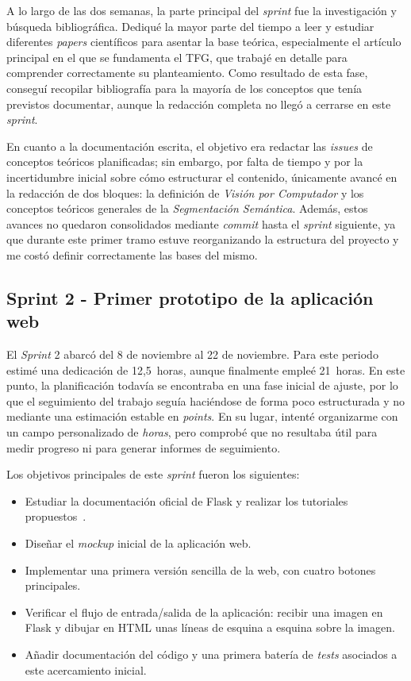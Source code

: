 A lo largo de las dos semanas, la parte principal del \textit{sprint} fue la investigación y búsqueda bibliográfica. Dediqué la mayor parte del tiempo a leer y estudiar diferentes \textit{papers} científicos para asentar la base teórica, especialmente el artículo principal en el que se fundamenta el TFG, que trabajé en detalle para comprender correctamente su planteamiento. Como resultado de esta fase, conseguí recopilar bibliografía para la mayoría de los conceptos que tenía previstos documentar, aunque la redacción completa no llegó a cerrarse en este \textit{sprint}.

En cuanto a la documentación escrita, el objetivo era redactar las \textit{issues} de conceptos teóricos planificadas; sin embargo, por falta de tiempo y por la incertidumbre inicial sobre cómo estructurar el contenido, únicamente avancé en la redacción de dos bloques: la definición de \textit{Visión por Computador} y los conceptos teóricos generales de la \textit{Segmentación Semántica}. Además, estos avances no quedaron consolidados mediante \textit{commit} hasta el \textit{sprint} siguiente, ya que durante este primer tramo estuve reorganizando la estructura del proyecto y me costó definir correctamente las bases del mismo.

\subsection{Sprint 2 - Primer prototipo de la aplicación web}
El \textit{Sprint} 2 abarcó del 8 de noviembre al 22 de noviembre. Para este periodo estimé una dedicación de 12,5~horas, aunque finalmente empleé 21~horas. En este punto, la planificación todavía se encontraba en una fase inicial de ajuste, por lo que el seguimiento del trabajo seguía haciéndose de forma poco estructurada y no mediante una estimación estable en \textit{points}. En su lugar, intenté organizarme con un campo personalizado de \textit{horas}, pero comprobé que no resultaba útil para medir progreso ni para generar informes de seguimiento.

Los objetivos principales de este \textit{sprint} fueron los siguientes:
\begin{itemize}
	\item Estudiar la documentación oficial de Flask y realizar los tutoriales propuestos~\cite{flask_user_guide}.
	\item Diseñar el \textit{mockup} inicial de la aplicación web.
	\item Implementar una primera versión sencilla de la web, con cuatro botones principales.
	\item Verificar el flujo de entrada/salida de la aplicación: recibir una imagen en Flask y dibujar en HTML unas líneas de esquina a esquina sobre la imagen.
	\item Añadir documentación del código y una primera batería de \textit{tests} asociados a este acercamiento inicial.
\end{itemize}

